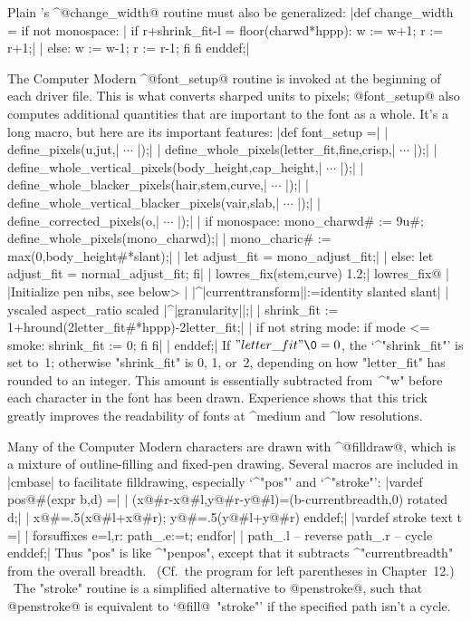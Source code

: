 \smallskip
Plain \MF's ^@change\_width@ routine must also be generalized:
\beginlines
|def change_width = if not monospace:           %
| if r+shrink_fit-l = floor(charwd*hppp): w := w+1; r := r+1;|
| else: w := w-1; r := r-1; fi fi enddef;|
\endlines

The Computer Modern ^@font\_setup@ routine is invoked at the beginning of
each driver file. This is what converts sharped units to pixels;
@font\_setup@ also computes additional quantities that are important to the
font as a whole. It's a long macro, but here are its important features:
\beginlines
|def font_setup =|
| define_pixels(u,jut,| $\cdots$ |);|
| define_whole_pixels(letter_fit,fine,crisp,| $\cdots$ |);|
| define_whole_vertical_pixels(body_height,cap_height,| $\cdots$ |);|
| define_whole_blacker_pixels(hair,stem,curve,| $\cdots$ |);|
| define_whole_vertical_blacker_pixels(vair,slab,| $\cdots$ |);|
| define_corrected_pixels(o,| $\cdots$ |);|
\smallbreak
| if monospace: mono_charwd# := 9u#; define_whole_pixels(mono_charwd);|
|  mono_charic# := max(0,body_height#*slant);|
|  let adjust_fit = mono_adjust_fit;|
| else: let adjust_fit = normal_adjust_fit; fi|
| lowres_fix(stem,curve) 1.2;|
^^@lowres\_fix@ \smallbreak
| |\<Initialize pen nibs, see below>
\smallbreak
| |^|currenttransform||:=identity slanted slant|
|  yscaled aspect_ratio scaled |^|granularity||;|
| shrink_fit := 1+hround(2letter_fit#*hppp)-2letter_fit;|
| if not string mode: if mode <= smoke: shrink_fit := 0; fi fi|
| enddef;|
\endlines
If $"letter\_fit"\0=0$, the `^"shrink\_fit"' is set to~1; otherwise
"shrink\_fit" is 0, 1, or~2, depending on how "letter\_fit" has
rounded to an integer. This amount is essentially subtracted from~^"w"
before each character in the font has been drawn. Experience shows that
this trick greatly improves the readability of fonts at ^{medium}
and ^{low resolutions}.

Many of the Computer Modern characters are drawn with ^@filldraw@, which
is a mixture of outline-filling and fixed-pen drawing. Several macros
are included in |cmbase| to facilitate filldrawing, especially
`^"pos"' and `^"stroke"':
\beginlines
|vardef pos@#(expr b,d) =|
| (x@#r-x@#l,y@#r-y@#l)=(b-currentbreadth,0) rotated d;|
| x@#=.5(x@#l+x@#r); y@#=.5(y@#l+y@#r) enddef;|
\smallbreak
|vardef stroke text t =|
| forsuffixes e=l,r: path_.e:=t; endfor|
| path_.l -- reverse path_.r -- cycle enddef;|
\endlines
Thus "pos" is like ^"penpos", except that it subtracts ^"currentbreadth"
from the overall breadth. \ (Cf.~the program for left parentheses in
Chapter~12.) \ The "stroke" routine is a simplified alternative to
@penstroke@, such that @penstroke@ is equivalent to `@fill@~"stroke"'
if the specified path isn't a cycle.

